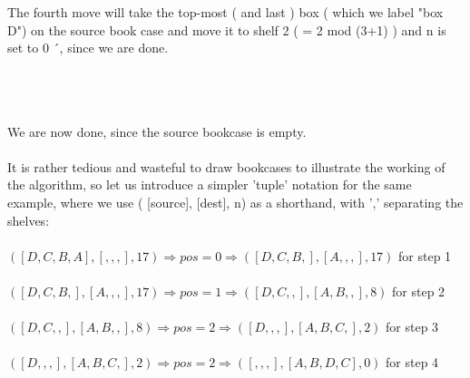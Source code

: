 \documentclass{article} %
\begin{document}
\noindent The fourth move will take the top-most ( and last )  box  ( which we label "box D") on the source book case and move it to shelf 2 ( = 2 mod (3+1) ) and n is set to 0 ´, since we are done.
\\
\\
\\
\\
\noindent We are now done, since the source bookcase  is empty.
\\
\\
\noindent It is rather  tedious  and wasteful  to draw bookcases  to illustrate the working of the algorithm, so let us introduce a simpler 'tuple' notation for the same example, where we  use ( [source], [dest], n)  as a shorthand, with ',' separating the shelves:
\\
\\
\(   ( [D,C,B,A], [, , , ], 17)    \Rightarrow  pos = 0  \Rightarrow  ( [D,C,B,], [A, , , ], 17)    \)  for step 1
\\
\\
\(  ( [D,C,B,], [A, , , ], 17)     \Rightarrow  pos = 1 \Rightarrow  ( [D,C,,], [A, B, , ], 8)    \) for step 2
\\
\\
\(   ( [D,C,,], [A, B, , ], 8)     \Rightarrow  pos = 2 \Rightarrow  ( [D,,,], [A ,B ,C, ], 2)   \) for step 3
\\
\\
\(  ( [D,,,], [A ,B ,C, ], 2)     \Rightarrow  pos = 2 \Rightarrow  ( [,,,], [A ,B ,D, C ], 0)    \) for step 4
\end{document}
